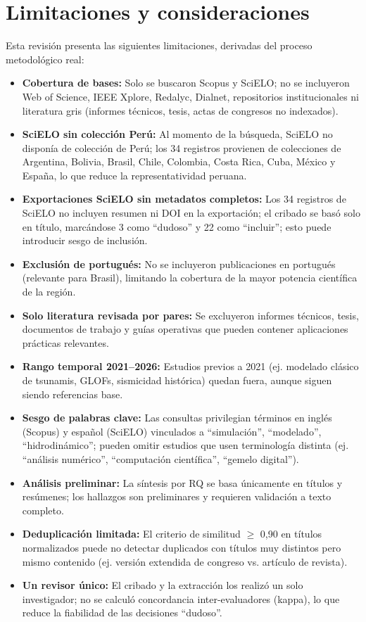 \documentclass[12pt,a4paper]{article}
\begin{document}
\section{Limitaciones y consideraciones}
Esta revisión presenta las siguientes limitaciones, derivadas del proceso metodológico real:
\begin{itemize}
  \item \textbf{Cobertura de bases:} Solo se buscaron Scopus y SciELO; no se incluyeron Web of Science, IEEE Xplore, Redalyc, Dialnet, repositorios institucionales ni literatura gris (informes técnicos, tesis, actas de congresos no indexados).
  \item \textbf{SciELO sin colección Perú:} Al momento de la búsqueda, SciELO no disponía de colección de Perú; los 34 registros provienen de colecciones de Argentina, Bolivia, Brasil, Chile, Colombia, Costa Rica, Cuba, México y España, lo que reduce la representatividad peruana.
  \item \textbf{Exportaciones SciELO sin metadatos completos:} Los 34 registros de SciELO no incluyen resumen ni DOI en la exportación; el cribado se basó solo en título, marcándose 3 como ``dudoso'' y 22 como ``incluir''; esto puede introducir sesgo de inclusión.
  \item \textbf{Exclusión de portugués:} No se incluyeron publicaciones en portugués (relevante para Brasil), limitando la cobertura de la mayor potencia científica de la región.
  \item \textbf{Solo literatura revisada por pares:} Se excluyeron informes técnicos, tesis, documentos de trabajo y guías operativas que pueden contener aplicaciones prácticas relevantes.
  \item \textbf{Rango temporal 2021--2026:} Estudios previos a 2021 (ej. modelado clásico de tsunamis, GLOFs, sismicidad histórica) quedan fuera, aunque siguen siendo referencias base.
  \item \textbf{Sesgo de palabras clave:} Las consultas privilegian términos en inglés (Scopus) y español (SciELO) vinculados a ``simulación'', ``modelado'', ``hidrodinámico''; pueden omitir estudios que usen terminología distinta (ej. ``análisis numérico'', ``computación científica'', ``gemelo digital'').
  \item \textbf{Análisis preliminar:} La síntesis por RQ se basa únicamente en títulos y resúmenes; los hallazgos son preliminares y requieren validación a texto completo.
  \item \textbf{Deduplicación limitada:} El criterio de similitud $\ge$ 0,90 en títulos normalizados puede no detectar duplicados con títulos muy distintos pero mismo contenido (ej. versión extendida de congreso vs. artículo de revista).
  \item \textbf{Un revisor único:} El cribado y la extracción los realizó un solo investigador; no se calculó concordancia inter-evaluadores (kappa), lo que reduce la fiabilidad de las decisiones ``dudoso''.
\end{itemize}
\end{document}
